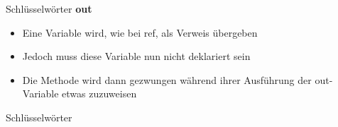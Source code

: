 \begin{frame}{Schlüsselwörter}
	\textbf{out}\\
	\begin{itemize}
		\item Eine Variable wird, wie bei \alert{ref}, als Verweis übergeben
		\item Jedoch muss diese Variable nun nicht deklariert sein
		\item Die Methode wird dann gezwungen während ihrer Ausführung der \alert{out}-Variable etwas zuzuweisen
	\end{itemize}
\end{frame}

\begin{frame}{Schlüsselwörter}
	
	
\end{frame}


